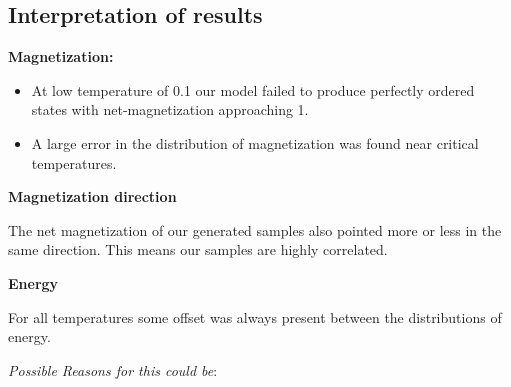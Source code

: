 \documentclass[12pt,a4paper]{article}
\begin{document}
\subsection{Interpretation of results}
\textbf{Magnetization:}\par
\begin{itemize}
    \item At low temperature of 0.1 our model failed to produce perfectly ordered states with net-magnetization approaching 1.
    \item A large error in the distribution of magnetization was found near critical temperatures.
\end{itemize}
\vspace{\baselineskip}
\textbf{Magnetization direction}\par
The net magnetization of our generated samples also pointed more or less in the same direction. This means our samples are highly correlated.\par
\vspace{\baselineskip}
\textbf{Energy}\par
For all temperatures some offset was always present between the distributions of energy.\par
\vspace{\baselineskip}
\textit{Possible Reasons for this could be}:\par
\end{document}
